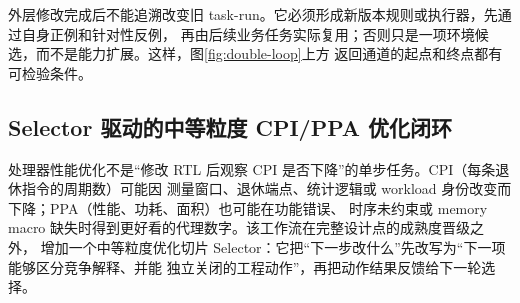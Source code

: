 \documentclass[UTF8,a4paper,zihao=-4,oneside]{ctexart}
\begin{document}
\newcommand{\TableLoopTriggerMatrix}{%
\begin{table}[H]
  \vspace{-4pt}
  \centering
  \small
  \caption{同一证据事件对内层与外层闭环的不同触发}
  \label{tab:loop-trigger-matrix}
  \begin{tabularx}{\linewidth}{@{}L{0.24\linewidth}L{0.24\linewidth}L{0.28\linewidth}Y@{}}
    \toprule
    证据面观测 & 当前任务的内层动作 & 触发外层的附加条件 & 外层修改对象 \\
    \midrule
    单次实现或周期错误 & 定位首个错误事务、修复并回归 & 无；当前合同足以处理 & 不修改环境 \\
    多次出现同类接口误判 & 当前节点返工并保留反例 & 跨节点重复，且可抽象为稳定不变量 & 知识面的 instruction/Skill，必要时控制面合同字段 \\
    缺少可执行 oracle & 当前任务保持 GAP & 同类任务均无法形成机器判定 & 知识面的 oracle/E2E 与证据面的资格规则 \\
    长跑退出码与证据矛盾 & 停止并保留 stage/signal/cleanup & 问题来自公共 runner 终止语义 & 执行/证据接口的状态协议与故障注入 \\
    工具或环境能力缺失 & 当前节点 BLOCKED 或截断 & 不是单一主机偶发故障，且存在稳定适配方案 & 执行适配器、环境发现与对应 E2E \\
    历史上下文污染或预算溢出 & 缩小当前查询并保持来源 & 在多次任务中重复引入过期或无关结论 & 知识面的 bounded recall 与证据索引策略 \\
    \bottomrule
  \end{tabularx}
\end{table}
}%

外层修改完成后不能追溯改变旧 task-run。它必须形成新版本规则或执行器，先通过自身正例和针对性反例，
再由后续业务任务实际复用；否则只是一项环境候选，而不是能力扩展。这样，图\ref{fig:double-loop}上方
返回通道的起点和终点都有可检验条件。

\subsection{Selector 驱动的中等粒度 CPI/PPA 优化闭环}

处理器性能优化不是“修改 RTL 后观察 CPI 是否下降”的单步任务。CPI（每条退休指令的周期数）可能因
测量窗口、退休端点、统计逻辑或 workload 身份改变而下降；PPA（性能、功耗、面积）也可能在功能错误、
时序未约束或 memory macro 缺失时得到更好看的代理数字。该工作流在完整设计点的成熟度晋级之外，
增加一个中等粒度优化切片 Selector：它把“下一步改什么”先改写为“下一项能够区分竞争解释、并能
独立关闭的工程动作”，再把动作结果反馈给下一轮选择。
\end{document}
